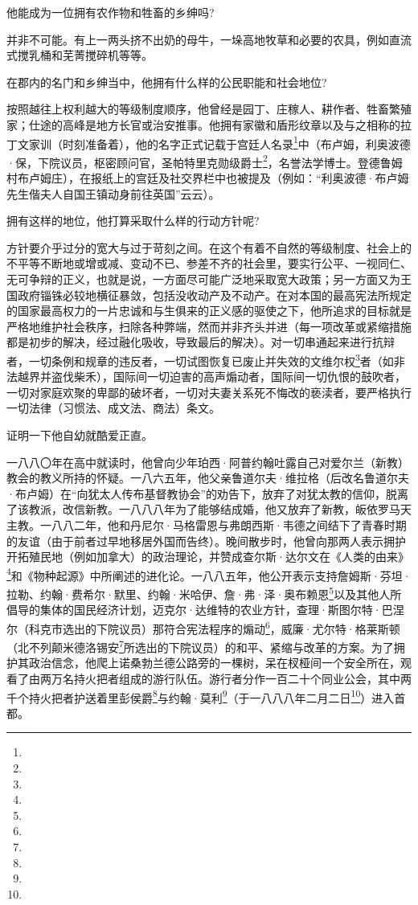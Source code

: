 \par 他能成为一位拥有农作物和牲畜的乡绅吗?
\par 并非不可能。有上一两头挤不出奶的母牛，一垛高地牧草和必要的农具，例如直流式搅乳桶和芜菁搅碎机等等。
\par 在郡内的名门和乡绅当中，他拥有什么样的公民职能和社会地位?
\par 按照越往上权利越大的等级制度顺序，他曾经是园丁、庄稼人、耕作者、牲畜繁殖家；仕途的高峰是地方长官或治安推事。他拥有家徽和盾形纹章以及与之相称的拉丁文家训（时刻准备着），他的名字正式记载于宫廷人名录\footnote{}中（布卢姆，利奥波德·保，下院议员，枢密顾问官，圣帕特里克勋级爵士\footnote{}，名誉法学博士。登德鲁姆村布卢姆庄），在报纸上的宫廷及社交界栏中也被提及（例如：“利奥波德·布卢姆先生偕夫人自国王镇动身前往英国”云云）。
\par 拥有这样的地位，他打算采取什么样的行动方针呢?
\par 方针要介乎过分的宽大与过于苛刻之间。在这个有着不自然的等级制度、社会上的不平等不断地或增或减、变动不已、参差不齐的社会里，要实行公平、一视同仁、无可争辩的正义，也就是说，一方面尽可能广泛地采取宽大政策；另一方面又为王国政府锱铢必较地横征暴敛，包括没收动产及不动产。在对本国的最高宪法所规定的国家最高权力的一片忠诚和与生俱来的正义感的驱使之下，他所追求的目标就是严格地维护社会秩序，扫除各种弊端，然而并非齐头并进（每一项改革或紧缩措施都是初步的解决，经过融化吸收，导致最后的解决）。对一切串通起来进行抗辩者，一切条例和规章的违反者，一切试图恢复已废止并失效的文维尔权\footnote{}者（如非法越界并盗伐柴禾），国际间一切迫害的高声煽动者，国际间一切仇恨的鼓吹者，一切对家庭欢聚的卑鄙的破坏者，一切对夫妻关系死不悔改的亵渎者，要严格执行一切法律（习惯法、成文法、商法）条文。
\par 证明一下他自幼就酷爱正直。
\par 一八八〇年在高中就读时，他曾向少年珀西·阿普约翰吐露自己对爱尔兰（新教）教会的教义所持的怀疑。一八六五年，他父亲鲁道尔夫·维拉格（后改名鲁道尔夫·布卢姆）在“向犹太人传布基督教协会”的劝告下，放弃了对犹太教的信仰，脱离了该教派，改信新教。一八八八年为了能够结成婚，他又放弃了新教，皈依罗马天主教。一八八二年，他和丹尼尔·马格雷恩与弗朗西斯·韦德之间结下了青春时期的友谊（由于前者过早地移居外国而告终）。晚间散步时，他曾向那两人表示拥护开拓殖民地（例如加拿大）的政治理论，并赞成查尔斯·达尔文在《人类的由来》\footnote{}和《物种起源》中所阐述的进化论。一八八五年，他公开表示支持詹姆斯·芬坦·拉勒、约翰·费希尔·默里、约翰·米哈伊、詹·弗·泽·奥布赖恩\footnote{}以及其他人所倡导的集体的国民经济计划，迈克尔·达维特的农业方针，查理·斯图尔特·巴涅尔（科克市选出的下院议员）那符合宪法程序的煽动\footnote{}，威廉·尤尔特·格莱斯顿（北不列颠米德洛锡安\footnote{}所选出的下院议员）的和平、紧缩与改革的方案。为了拥护其政治信念，他爬上诺桑勃兰德公路旁的一棵树，呆在杈桠间一个安全所在，观看了由两万名持火把者组成的游行队伍。游行者分作一百二十个同业公会，其中两千个持火把者护送着里彭侯爵\footnote{}与约翰·莫利\footnote{}（于一八八八年二月二日\footnote{}）进入首都。
